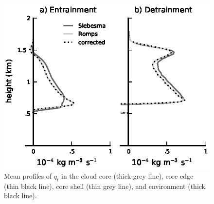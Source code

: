 \documentclass[draft,grl]{agutex}
\begin{document}
\begin{figure}
  \label{fig:numerical_correction}
  \noindent\includegraphics[width=39pc]{./figures/numerical_correction}
  \caption{Mean profiles of $q_t$ in the cloud core (thick grey line), core 
  edge (thin black line), core shell (thin grey line), and environment (thick 
  black line).
  }
\end{figure}

%
%
%
%
%
%

\end{document}
